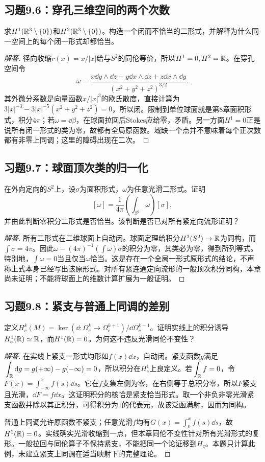 \subsection*{习题9.6：穿孔三维空间的两个次数}
求$H^1(\mathbb{R}^3\setminus\{0\})$和$H^2(\mathbb{R}^3\setminus\{0\})$。构造一个闭而不恰当的二形式，并解释为什么同一空间上的每个闭一形式却都恰当。
\begin{proof}[解答]
径向收缩$r(x)=x/|x|$给与$S^2$的同伦等价，所以$H^1=0,H^2=\mathbb{R}$。在穿孔空间令
\[
 \omega=\frac{x\dd y\wedge\dd z-y\dd x\wedge\dd z+z\dd x\wedge\dd y}
 {(x^2+y^2+z^2)^{3/2}}.
\]
其外微分系数是向量函数$x/|x|^3$的欧氏散度，直接计算为$3|x|^{-3}-3|x|^{-5}(x^2+y^2+z^2)=0$，所以闭。限制到单位球面就是第8章面积形式，积分$4\pi$；若$\omega=\dd\beta$，在球面拉回后Stokes应给零，矛盾。另一方面$H^1=0$正是说所有闭一形式的类为零，故都有全局原函数。域缺一个点并不意味着每个正次数都有非零上同调；这里的障碍出现在二次。
\end{proof}

\subsection*{习题9.7：球面顶次类的归一化}
在外向定向的$S^2$上，设$\sigma$为面积形式，$\omega$为任意光滑二形式。证明
\[
 [\omega]=\frac1{4\pi}\left(\int_{S^2}\omega\right)[\sigma],
\]
并由此判断零积分二形式是否恰当。该判断是否已对所有紧定向流形证明？
\begin{proof}[解答]
所有二形式在二维球面上自动闭。球面定理给积分$H^2(S^2)\to\mathbb{R}$为同构，而$\int\sigma=4\pi$。因此$\omega-(4\pi)^{-1}(\int\omega)\sigma$的积分为零，其类必为零，得到所列等式。特别地，$\int\omega=0$当且仅当$\omega$恰当。这是存在一个全局一形式原形式的结论，不声称上式本身已经写出该原形式。对所有紧连通定向流形的一般顶次积分同构，本章尚未证明；不能将球面上的维数计算扩展为一般证明。
\end{proof}

\subsection*{习题9.8：紧支与普通上同调的差别}
定义$H_c^k(M)=\ker(\dd:\Omega_c^k\to\Omega_c^{k+1})/\dd\Omega_c^{k-1}$。证明实线上的积分诱导$H_c^1(\mathbb{R})\simeq\mathbb{R}$，而$H^1(\mathbb{R})=0$。为何这不违反光滑同伦不变性？
\begin{proof}[解答]
在实线上紧支一形式均形如$f(x)\dd x$，自动闭。紧支函数$g$满足$\int_\R\dd g=g(+\infty)-g(-\infty)=0$，所以积分在$H_c^1$上良定义。若$\int_\R f=0$，令$F(x)=\int_{-\infty}^x f(s)\dd s$。它在$f$支集左侧为零，在右侧等于总积分零，所以$F$紧支且光滑，$\dd F=f\dd x$。这证明积分的核恰是紧支恰当形式。取一个非负非零光滑紧支函数并除以其正积分，可得积分为$1$的代表元，故该泛函满射，因而为同构。

普通上同调允许原函数不紧支；任意光滑$f$均有$G(x)=\int_0^x f(s)\dd s$，故$H^1(\mathbb{R})=0$。实线确实光滑收缩到一点，但本章同伦不变性针对所有光滑形式的复形。一般拉回与同伦算子不保持紧支，不能把同一个论证移到$H_c$。本题只计算此例，未建立紧支上同调在适当映射下的完整理论。
\end{proof}
